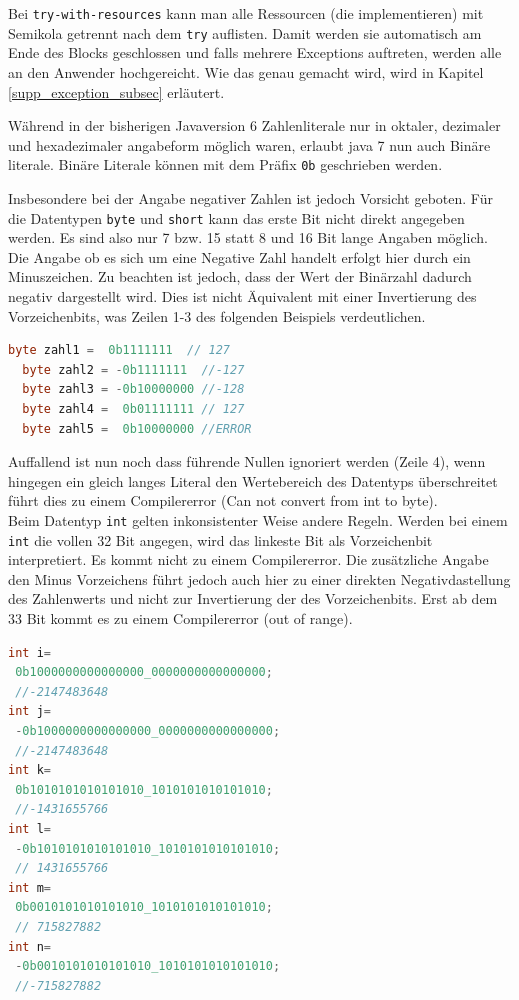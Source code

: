 \documentclass[times, 10pt,twocolumn]{article}
\begin{document}
Bei \texttt{try-with-resources} kann man alle Ressourcen (die  implementieren) mit Semikola getrennt 
nach dem \texttt{try} auflisten. Damit werden sie automatisch am Ende des Blocks geschlossen und falls mehrere Exceptions auftreten,
werden alle an den Anwender hochgereicht. Wie das genau gemacht wird, wird in Kapitel \ref{supp_exception_subsec} erläutert. 


Während in der bisherigen Javaversion 6 Zahlenliterale nur in oktaler, dezimaler und hexadezimaler angabeform möglich waren, erlaubt java 7 nun auch Binäre literale. Binäre Literale können mit dem Präfix \texttt{0b} geschrieben werden.

Insbesondere bei der Angabe negativer Zahlen ist jedoch Vorsicht geboten. Für die Datentypen \texttt{byte} und \texttt{short} kann das erste Bit nicht direkt angegeben werden. Es sind also nur 7 bzw. 15 statt 8 und 16 Bit lange Angaben möglich. Die Angabe ob es sich um eine Negative Zahl handelt erfolgt hier durch ein Minuszeichen. Zu beachten ist jedoch, dass der Wert der Binärzahl dadurch negativ dargestellt wird. Dies ist nicht Äquivalent mit einer Invertierung des Vorzeichenbits, was Zeilen 1-3 des folgenden Beispiels verdeutlichen.\cite{sbJ7literals}
\begin{lstlisting}[language=java,breaklines=true]
  byte zahl1 =  0b1111111  // 127
  byte zahl2 = -0b1111111  //-127
  byte zahl3 = -0b10000000 //-128
  byte zahl4 =  0b01111111 // 127
  byte zahl5 =  0b10000000 //ERROR
\end{lstlisting}
Auffallend ist nun noch dass führende Nullen ignoriert werden (Zeile 4), wenn hingegen ein gleich langes Literal den Wertebereich des Datentyps überschreitet führt dies zu einem Compilererror (Can not convert from int to byte)\cite{sbJ7literals}.\\

Beim Datentyp \texttt{int} gelten inkonsistenter Weise andere Regeln. Werden bei einem \texttt{int} die vollen 32 Bit angegen, wird das linkeste Bit als Vorzeichenbit interpretiert. Es kommt nicht zu einem Compilererror. Die zusätzliche Angabe den Minus Vorzeichens führt jedoch auch hier zu einer direkten Negativdastellung des Zahlenwerts und nicht zur Invertierung der des Vorzeichenbits. Erst ab dem 33 Bit kommt es zu einem Compilererror (out of range).
\begin{lstlisting}[language=java,breaklines=true]
int i=
 0b1000000000000000_0000000000000000;
 //-2147483648
int j=
 -0b1000000000000000_0000000000000000;
 //-2147483648
int k=
 0b1010101010101010_1010101010101010;
 //-1431655766
int l=
 -0b1010101010101010_1010101010101010;
 // 1431655766
int m=
 0b0010101010101010_1010101010101010;
 // 715827882
int n=
 -0b0010101010101010_1010101010101010;
 //-715827882
\end{lstlisting}
\end{document}
